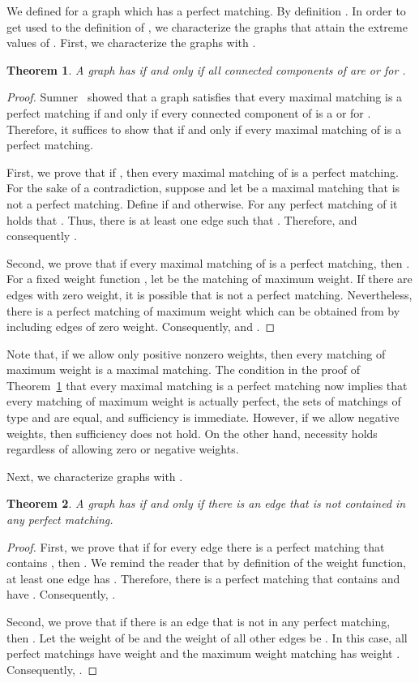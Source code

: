 \documentclass{article}
\newtheorem{thm}{Theorem}
\begin{document}
We defined  for a graph  which has a perfect matching. By definition . In order to get used to the definition of , we characterize the graphs that attain the extreme values of . First, we characterize the graphs  with .

\begin{thm}
\label{thm:eta1}
A graph  has  if and only if all connected components of  are  or  for .
\end{thm}
\begin{proof}
Sumner~\cite{sumner79} showed that a graph  satisfies that every maximal matching is a perfect matching if and only if every connected component of  is a  or  for . Therefore, it suffices to show that  if and only if every maximal matching of  is a perfect matching.

First, we prove that if , then every maximal matching of  is a perfect matching. For the sake of a contradiction, suppose  and let  be a maximal matching that is not a perfect matching. Define  if  and  otherwise. For any perfect matching  of  it holds that . Thus, there is at least one edge  such that . Therefore,  and consequently .

Second, we prove that if every maximal matching of  is a perfect matching, then . For a fixed weight function , let  be the matching of maximum weight. If there are edges with zero weight, it is possible that  is not a perfect matching. Nevertheless, there is a perfect matching of maximum weight  which can be obtained from  by including edges of zero weight. Consequently,  and .
\end{proof}

Note that, if we allow only positive nonzero weights, then every matching of maximum weight is a maximal matching.
The condition in the proof of Theorem~\ref{thm:eta1} that every maximal matching is a perfect matching now implies that every matching of maximum weight is actually perfect, the sets of matchings of type  and  are equal, and sufficiency is immediate.
However, if we allow negative weights, then sufficiency does not hold.
On the other hand, necessity holds regardless of allowing zero or negative weights.

Next, we characterize graphs  with .

\begin{thm} \label{thm:eta0}
A graph  has  if and only if there is an edge  that is not contained in any perfect matching.
\end{thm}
\begin{proof}
First, we prove that if for every edge  there is a perfect matching that contains , then . We remind the reader that by definition of the weight function, at least one edge  has . Therefore, there is a perfect matching  that contains  and have . Consequently, .

Second, we prove that if there is an edge  that is not in any perfect matching, then . Let the weight of  be  and the weight of all other edges be . In this case, all perfect matchings have weight  and the maximum weight matching has weight . Consequently, .
\end{proof}
\end{document}

